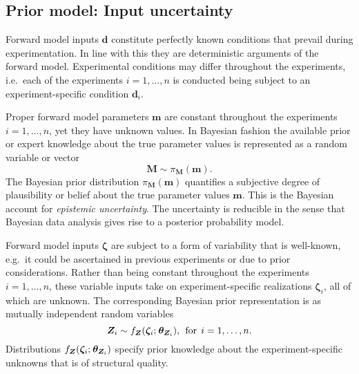 \subsection{Prior model: Input uncertainty} \label{sec:PEM:Multilevel:Uncertainty}
Forward model inputs \(\bm{d}\) constitute perfectly known conditions that prevail during experimentation.
In line with this they are deterministic arguments of the forward model.
Experimental conditions may differ throughout the experiments, i.e.\ each of the experiments \(i=1,\ldots,n\) is conducted being subject to an experiment-specific condition \(\bm{d}_i\).
\par %
Proper forward model parameters \(\bm{m}\) are constant throughout the experiments \(i=1,\ldots,n\), yet they have unknown values.
In Bayesian fashion the available prior or expert knowledge about the true parameter values is represented as a random variable or vector
\begin{equation} \label{eq:PEM:Multilevel:ParametricPriorM}
  \bm{M} \sim \pi_{\bm{M}} (\bm{m}).
\end{equation}
The Bayesian prior distribution \(\pi_{\bm{M}} (\bm{m})\) quantifies a subjective degree of plausibility or belief about the true parameter values \(\bm{m}\).
This is the Bayesian account for \textit{epistemic uncertainty}.
The uncertainty is reducible in the sense that Bayesian data analysis gives rise to a posterior probability model.
\par %
Forward model inputs \(\bm{\zeta}\) are subject to a form of variability that is well-known, e.g.\ it could be ascertained in previous experiments or due to prior considerations.
Rather than being constant throughout the experiments \(i=1,\ldots,n\), these variable inputs take on experiment-specific realizations \(\bm{\zeta}_i\), all of which are unknown.
The corresponding Bayesian prior representation is as mutually independent random variables
\begin{equation} \label{eq:PEM:Multilevel:StructuralPriorZ}
  \bm{Z}_i \sim f_{\bm{Z}}(\bm{\zeta}_i ;{\:\!} \bm{\theta}_{\bm{Z}_i}), \;\, \text{for} \;\, i=1,\ldots,n.
\end{equation}
Distributions \(f_{\bm{Z}}(\bm{\zeta}_i ;{\:\!} \bm{\theta}_{\bm{Z}_i})\) specify prior knowledge about the experiment-specific unknowns that is of structural quality.
